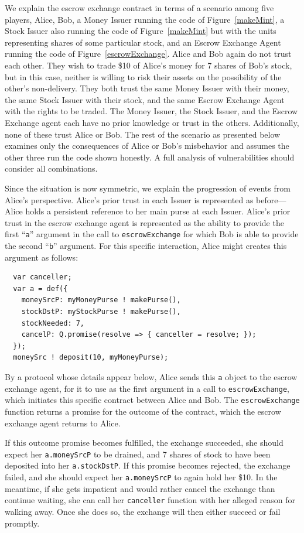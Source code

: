 \documentclass{llncs}
\begin{document}
We explain the escrow exchange contract in terms of a scenario among five players, Alice, Bob, a Money Issuer running the code of Figure~\ref{makeMint}, a Stock Issuer also running the code of Figure~\ref{makeMint} but with the units representing shares of some particular stock, and an Escrow Exchange Agent running the code of Figure~\ref{escrowExchange}. Alice and Bob again do not trust each other. They wish to trade \$10 of Alice's money for 7 shares of Bob's stock, but in this case, neither is willing to risk their assets on the possibility of the other's non-delivery. They both trust the same Money Issuer with their money, the same Stock Issuer with their stock, and the same Escrow Exchange Agent with the rights to be traded. The Money Issuer, the Stock Issuer, and the Escrow Exchange agent each have no prior knowledge or trust in the others. Additionally, none of these trust Alice or Bob. The rest of the scenario as presented below examines only the consequences of Alice or Bob's misbehavior and assumes the other three run the code shown honestly. A full analysis of vulnerabilities should consider all combinations.

Since the situation is now symmetric, we explain the progression of events from Alice's perspective. Alice's prior trust in each Issuer is represented as before---Alice holds a persistent reference to her main purse at each Issuer. Alice's prior trust in the escrow exchange agent is represented as the ability to provide the first ``{\tt a}'' argument in the call to {\tt escrowExchange} for which Bob is able to provide the second ``{\tt b}'' argument. For this specific interaction, Alice might creates this argument as follows:

\begin{verbatim}
  var canceller;
  var a = def({
    moneySrcP: myMoneyPurse ! makePurse(),
    stockDstP: myStockPurse ! makePurse(),
    stockNeeded: 7,
    cancelP: Q.promise(resolve => { canceller = resolve; });
  });
  moneySrc ! deposit(10, myMoneyPurse);
\end{verbatim}

By a protocol whose details appear below, Alice sends this {\tt a} object to the escrow exchange agent, for it to use as the first argument in a call to {\tt escrowExchange}, which initiates this specific contract between Alice and Bob. The {\tt escrowExchange} function returns a promise for the outcome of the contract, which the escrow exchange agent returns to Alice. 

If this outcome promise becomes fulfilled, the exchange succeeded,  she should expect her {\tt a.moneySrcP} to be drained, and 7 shares of stock to have been deposited into her {\tt a.stockDstP}. If this promise becomes rejected, the exchange failed, and she should expect her {\tt a.moneySrcP} to again hold her \$10. In the meantime, if she gets impatient and would rather cancel the exchange than continue waiting, she can call her {\tt canceller} function with her alleged reason for walking away. Once she does so, the exchange will then either succeed or fail promptly.
\end{document}
